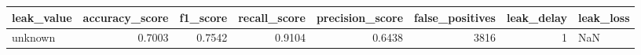 \begin{tabular}{lrrrrrrl}
\toprule
leak\_value & accuracy\_score & f1\_score & recall\_score & precision\_score & false\_positives & leak\_delay & leak\_loss \\
\midrule
unknown & 0.7003 & 0.7542 & 0.9104 & 0.6438 & 3816 & 1 & NaN \\
\bottomrule
\end{tabular}
